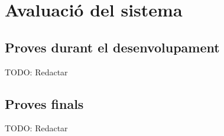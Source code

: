 
\chapter{Avaluació del sistema} %

\label{Chapter8} %


\section{Proves durant el desenvolupament}

TODO: Redactar


\section{Proves finals}

TODO: Redactar